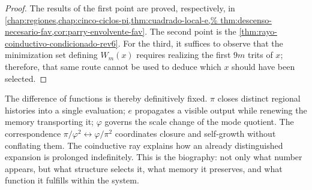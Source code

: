 \begin{proof}
The results of the first point are proved, respectively, in
\cref{chap:regiones,chap:cinco-ciclos-pi,thm:cuadrado-local-e,%
thm:descenso-necesario-fav,cor:parry-envolvente-fav}. The second point is
the \cref{thm:rayo-coinductivo-condicionado-rev6}. For the third, it suffices to
observe that the minimization set defining \(W_m(x)\) requires
realizing the first \(9m\) trits of \(x\); therefore, that same route cannot be used
to deduce which \(x\) should have been selected.
\end{proof}

The difference of functions is thereby definitively fixed. \(\pi\) closes
distinct regional histories into a single evaluation; \(e\) propagates a
visible output while renewing the memory transporting it; \(\varphi\)
governs the scale change of the mode quotient. The correspondence
\(\pi/\varphi^2\leftrightarrow\varphi/\pi^2\) coordinates closure and
self-growth without conflating them. The coinductive ray explains how an
already distinguished expansion is prolonged indefinitely. This is the biography:
not only what number appears, but what structure selects it, what memory it
preserves, and what function it fulfills within the system.
\fi
